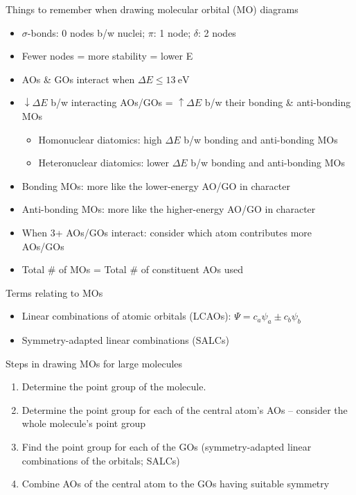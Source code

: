 \documentclass[10pt,landscape]{article}
\begin{document}
\begin{multicols}{3}
Things to remember when drawing molecular orbital (MO) diagrams
\begin{itemize}
	\item $\sigma$-bonds: 0 nodes b/w nuclei; $\pi$: 1 node; $\delta$: 2 nodes 
	\item Fewer nodes = more stability = lower E
	\item AOs \& GOs interact when $\Delta E \leq \SI{13}{\electronvolt}$
	\item $\downarrow \Delta E$ b/w interacting AOs/GOs = $\uparrow \Delta E$ b/w their bonding \& anti-bonding MOs
	\begin{itemize}
			\item Homonuclear diatomics: high $\Delta E$ b/w bonding and anti-bonding MOs
			\item Heteronuclear diatomics: lower $\Delta E$ b/w bonding and anti-bonding MOs
	\end{itemize}
	\item Bonding MOs: more like the lower-energy AO/GO in character
	\item Anti-bonding MOs: more like the higher-energy AO/GO in character
	\item When 3+ AOs/GOs interact: consider which atom contributes more AOs/GOs
	\item Total \# of MOs = Total \# of constituent AOs used
\end{itemize}

Terms relating to MOs
\begin{itemize}
	\item Linear combinations of atomic orbitals (LCAOs): $\Psi = c_a \psi_a \pm c_b \psi_b$
	\item Symmetry-adapted linear combinations (SALCs)
\end{itemize}

Steps in drawing MOs for large molecules
\begin{enumerate}
	\item Determine the point group of the molecule.
	\item Determine the point group for each of the central atom's AOs -- consider the whole molecule's point group
	\item Find the point group for each of the GOs (symmetry-adapted linear combinations of the orbitals; SALCs) 
	\item Combine AOs of the central atom to the GOs having suitable symmetry
\end{enumerate}

\hrulefill
\end{multicols}
\end{document}
